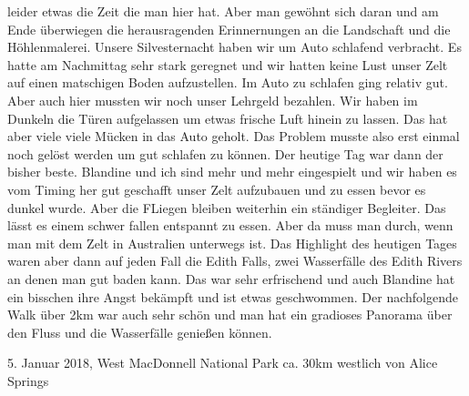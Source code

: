\documentclass[11pt]{book}
\begin{document}
leider etwas die Zeit die man hier hat. Aber man gewöhnt sich daran und am Ende überwiegen die herausragenden Erinnernungen an die 
Landschaft und die Höhlenmalerei. Unsere Silvesternacht haben wir um Auto schlafend verbracht. Es hatte am Nachmittag sehr stark 
geregnet und wir hatten keine Lust unser Zelt auf einen matschigen Boden aufzustellen. Im Auto zu schlafen ging relativ gut. Aber 
auch hier mussten wir noch unser Lehrgeld bezahlen. Wir haben im Dunkeln die Türen aufgelassen um etwas frische Luft hinein zu lassen.
Das hat aber viele viele Mücken in das Auto geholt. Das Problem musste also erst einmal noch gelöst werden um gut schlafen zu können.
Der heutige Tag war dann der bisher beste. Blandine und ich sind mehr und mehr eingespielt und wir haben es vom Timing her gut 
geschafft unser Zelt aufzubauen und zu essen bevor es dunkel wurde. Aber die FLiegen bleiben weiterhin ein ständiger Begleiter. 
Das lässt es einem schwer fallen entspannt zu essen. Aber da muss man durch, wenn man mit dem Zelt in Australien unterwegs ist. 
Das Highlight des heutigen Tages waren aber dann auf jeden Fall die Edith Falls, zwei Wasserfälle des Edith Rivers an denen man 
gut baden kann. Das war sehr erfrischend und auch Blandine hat ein bisschen ihre Angst bekämpft und ist etwas geschwommen. Der 
nachfolgende Walk über 2km war auch sehr schön und man hat ein gradioses Panorama über den Fluss und die Wasserfälle genießen können.

5. Januar 2018, West MacDonnell National Park ca. 30km westlich von Alice Springs
\end{document}
